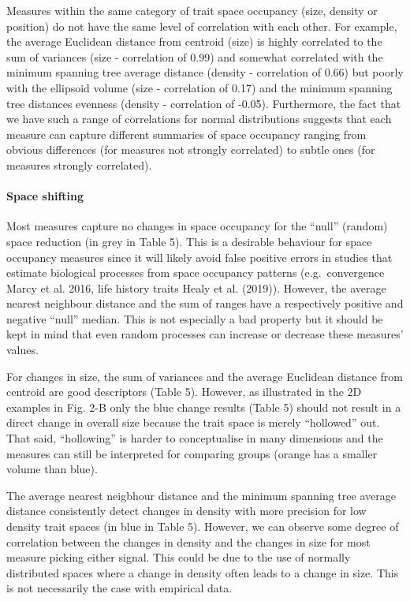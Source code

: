 \documentclass[]{article}
\let\oldparagraph\paragraph
\renewcommand{\paragraph}[1]{\oldparagraph{#1}\mbox{}}
\begin{document}
Measures within the same category of trait space occupancy (size,
density or position) do not have the same level of correlation with each
other. For example, the average Euclidean distance from centroid (size)
is highly correlated to the sum of variances (size - correlation of
0.99) and somewhat correlated with the minimum spanning tree average
distance (density - correlation of 0.66) but poorly with the ellipsoid
volume (size - correlation of 0.17) and the minimum spanning tree
distances evenness (density - correlation of -0.05). Furthermore, the
fact that we have such a range of correlations for normal distributions
suggests that each measure can capture different summaries of space
occupancy ranging from obvious differences (for measures not strongly
correlated) to subtle ones (for measures strongly correlated).

\paragraph{Space shifting}\label{space-shifting-1}

Most measures capture no changes in space occupancy for the ``null''
(random) space reduction (in grey in Table 5). This is a desirable
behaviour for space occupancy measures since it will likely avoid false
positive errors in studies that estimate biological processes from space
occupancy patterns (e.g.~convergence Marcy et al. 2016, life history
traits Healy et al. (2019)). However, the average nearest neighbour
distance and the sum of ranges have a respectively positive and negative
``null'' median. This is not especially a bad property but it should be
kept in mind that even random processes can increase or decrease these
measures' values.

For changes in size, the sum of variances and the average Euclidean
distance from centroid are good descriptors (Table 5). However, as
illustrated in the 2D examples in Fig. 2-B only the blue change results
(Table 5) should not result in a direct change in overall size because
the trait space is merely ``hollowed'' out. That said, ``hollowing'' is
harder to conceptualise in many dimensions and the measures can still be
interpreted for comparing groups (orange has a smaller volume than
blue).

The average nearest neigbhour distance and the minimum spanning tree
average distance consistently detect changes in density with more
precision for low density trait spaces (in blue in Table 5). However, we
can observe some degree of correlation between the changes in density
and the changes in size for most measure picking either signal. This
could be due to the use of normally distributed spaces where a change in
density often leads to a change in size. This is not necessarily the
case with empirical data.
\end{document}
